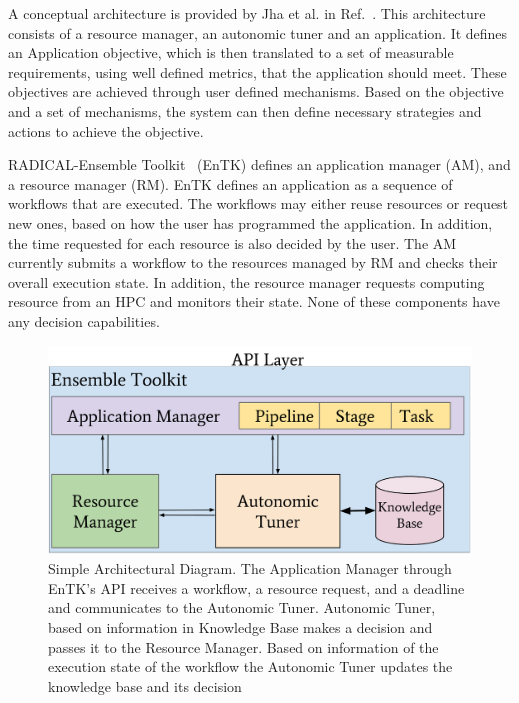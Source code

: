 
A conceptual architecture is provided by Jha et al. in Ref.~\cite{jha2009self}. 
This architecture consists of a resource manager, an autonomic tuner and an 
application. It defines an Application objective, which is then translated to a 
set of measurable requirements, using well defined metrics, that the 
application should meet. These objectives are achieved through user defined 
mechanisms. Based on the objective and a set of mechanisms, the system can then 
define necessary strategies and actions to achieve the objective.

RADICAL-Ensemble Toolkit~\cite{balasubramanian2018harnessing} (EnTK) defines an 
application manager (AM), and a resource manager (RM). EnTK defines an 
application as a sequence of workflows that are executed. The workflows may 
either reuse resources or request new ones, based on how the user has 
programmed the application. In addition, the time requested for each resource 
is also decided by the user. The AM currently submits a workflow to the 
resources managed by RM and checks their overall execution state. In addition, 
the resource manager requests computing resource from an HPC and monitors their 
state. None of these components have any decision capabilities.

\begin{figure}[t]
    \centering
    \includegraphics[width=.95\textwidth]{figures/AutonomicSubsystem.pdf}
    \caption{Simple Architectural Diagram. The Application Manager through 
    EnTK's API receives a workflow, a resource request, and a deadline and 
    communicates to the Autonomic Tuner. Autonomic Tuner, based on information 
    in Knowledge Base makes a decision and passes it to the Resource Manager. 
    Based on information of the execution state of the workflow the Autonomic 
    Tuner updates the knowledge base and its decision}\label{fig:architecture}
\end{figure}


